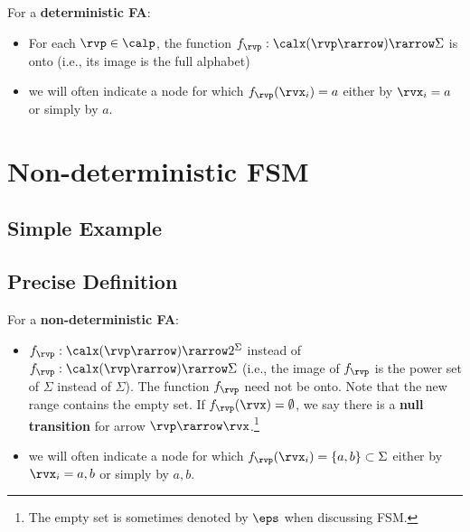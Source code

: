 \begin{mdframed}[hidealllines=true,backgroundcolor=blue!10]
For a {\bf deterministic FA}:
\begin{itemize}
\item For each $\rvp\in\calp$, the function $f_\rvp:\calx(\rvp\rarrow)\rarrow \Sigma$ is onto (i.e.,
its image is the full alphabet)

\item
we will often indicate a node for 
which $f_{\rvp}(\rvx_i)=a$ either by $\rvx_i=a$
or simply by $a$. 
\end{itemize}\end{mdframed}

\section{Non-deterministic FSM}
\subsection{Simple Example}
\subsection{Precise Definition}

\begin{mdframed}[hidealllines=true,backgroundcolor=blue!10]
For a {\bf non-deterministic FA}:
\begin{itemize}
\item
$f_\rvp:\calx(\rvp\rarrow)\rarrow 2^\Sigma$ 
instead of 
$f_\rvp:\calx(\rvp\rarrow)\rarrow \Sigma$ (i.e., the image of $f_\rvp$
is the power set of $\Sigma$ 
instead of $\Sigma$).
The function $f_\rvp$ need not be onto.
Note that the new range contains the empty set.
If $f_\rvp(\rvx)=\emptyset$, we say there is a  {\bf null transition} for arrow 
$\rvp\rarrow \rvx$.\footnote{The empty set is sometimes denoted by $\eps$ 
when discussing FSM.} 
\item
we will often indicate a node for 
which $f_{\rvp}(\rvx_i)=\{a,b\}\subset\Sigma$ either by $\rvx_i=a, b$
or simply by $a, b$. 
\end{itemize}\end{mdframed}
